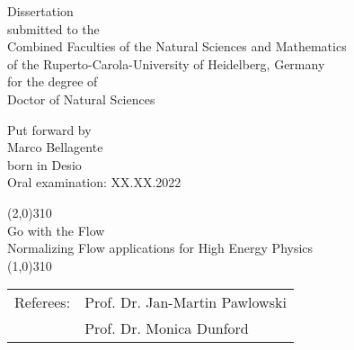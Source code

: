 \thispagestyle{empty}
\mbox{}
\vspace*{5mm}
\begin{center}
\sffamily
\large
Dissertation\\[1.5mm]
submitted to the\\[1.5mm] 
Combined Faculties of the Natural Sciences and Mathematics\\[1.5mm]
of the Ruperto-Carola-University of Heidelberg, Germany \\[1.5mm]
for the degree of \\[1.5mm]
Doctor of Natural Sciences


\vfill
{
\normalsize
Put forward by\\[1.5mm]
Marco Bellagente\\
born in Desio\\
Oral examination: XX.XX.2022
}
\end{center}
\clearpage{\pagestyle{empty}\cleardoublepage}

\newpage
\thispagestyle{empty}
\mbox{}
\vspace*{3cm}
\sffamily
\begin{center}
\line(2,0){310}\\[3mm]
\Huge{Go with the Flow}\\[2mm]
\Large{Normalizing Flow applications for High Energy Physics}\\[3mm]
\line(1,0){310}
\end{center}


\vfill
\begin{tabular}{ll}
Referees: &  Prof. Dr. Jan-Martin Pawlowski\\[2mm]
               &  Prof. Dr. Monica Dunford \\
\end{tabular}

\rmfamily

\newpage